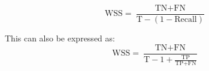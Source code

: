 \documentclass[10pt, english]{article}
\begin{document}
\begin{equation}
\text{WSS} = \frac{\text{TN} + \text{FN}}{\text{T} - (1 - \text{Recall})}
\end{equation}

This can also be expressed as:
\begin{equation}
\text{WSS} = \frac{\text{TN} + \text{FN}}{\text{T} - 1 + \frac{\text{TP}}{\text{TP} + \text{FN}}}
\end{equation}


\printbibliography
\end{document}
